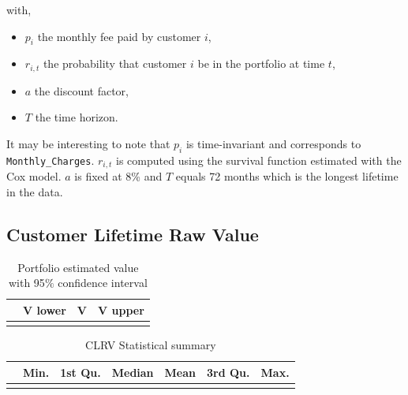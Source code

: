 \documentclass[
]{book}
\providecommand{\tightlist}{%
  \setlength{\itemsep}{0pt}\setlength{\parskip}{0pt}}
\begin{document}
with,

\begin{itemize}
\tightlist
\item
  \(p_i\) the monthly fee paid by customer \(i\),
\item
  \(r_{i,t}\) the probability that customer \(i\) be in the portfolio at time \(t\),
\item
  \(a\) the discount factor,
\item
  \(T\) the time horizon.
\end{itemize}

It may be interesting to note that \(p_i\) is time-invariant and corresponds to \texttt{Monthly\_Charges}. \(r_{i,t}\) is computed using the survival function estimated with the Cox model. \(a\) is fixed at 8\% and \(T\) equals 72 months which is the longest lifetime in the data.

\hypertarget{customer-lifetime-raw-value}{%
\subsection{Customer Lifetime Raw Value}\label{customer-lifetime-raw-value}}

\begin{table}[H]

\caption{\label{tab:custValuesSum}Portfolio estimated value with 95$\%$ confidence interval}
\centering
\begin{tabular}[t]{llll}
\toprule
  & V lower & V & V upper\\
\midrule
\cellcolor{gray!6}{} & \cellcolor{gray!6}{17,604,144} & \cellcolor{gray!6}{18,270,000} & \cellcolor{gray!6}{19,031,648}\\
\bottomrule
\end{tabular}
\end{table}

\begin{table}[H]

\caption{\label{tab:custValuesStats}CLRV Statistical summary}
\centering
\begin{tabular}[t]{lrrrrrr}
\toprule
  & Min. & 1st Qu. & Median & Mean & 3rd Qu. & Max.\\
\midrule
\cellcolor{gray!6}{} & \cellcolor{gray!6}{323.99} & \cellcolor{gray!6}{1125.9} & \cellcolor{gray!6}{2104.66} & \cellcolor{gray!6}{2598.12} & \cellcolor{gray!6}{3850.41} & \cellcolor{gray!6}{6815.42}\\
\bottomrule
\end{tabular}
\end{table}
\end{document}

